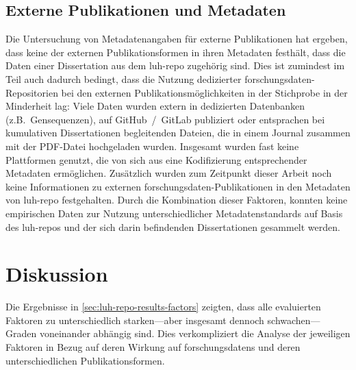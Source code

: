 \subsection{Externe Publikationen und Metadaten}\label{sec:luh-repo-results-external-metadata}
Die Untersuchung von Metadatenangaben für externe Publikationen hat ergeben, dass keine der externen Publikationsformen in ihren Metadaten festhält, dass die Daten einer Dissertation aus dem \gls{luh-repo} zugehörig sind.
Dies ist zumindest im Teil auch dadurch bedingt, dass die Nutzung dedizierter \gls{forschungsdaten}-Repositorien bei den externen Publikationsmöglichkeiten in der Stichprobe in der Minderheit lag:
Viele Daten wurden extern in dedizierten Datenbanken (z.B.~Gensequenzen), auf GitHub~/~GitLab publiziert oder entsprachen bei kumulativen Dissertationen begleitenden Dateien, die in einem Journal zusammen mit der PDF-Datei hochgeladen wurden.
Insgesamt wurden fast keine Plattformen genutzt, die von sich aus eine Kodifizierung entsprechender Metadaten ermöglichen.
Zusätzlich wurden zum Zeitpunkt dieser Arbeit noch keine Informationen zu externen \gls{forschungsdaten}-Publikationen in den Metadaten von \gls{luh-repo} festgehalten.
Durch die Kombination dieser Faktoren, konnten keine empirischen Daten zur Nutzung unterschiedlicher Metadatenstandards auf Basis des \gls{luh-repo}s und der sich darin befindenden Dissertationen gesammelt werden.

\section{Diskussion}\label{sec:luh-repo-discussion}
Die Ergebnisse in \cref{sec:luh-repo-results-factors} zeigten, dass alle evaluierten Faktoren zu unterschiedlich starken---aber insgesamt dennoch schwachen---Graden voneinander abhängig sind.
Dies verkompliziert die Analyse der jeweiligen Faktoren in Bezug auf deren Wirkung auf \glspl{forschungsdaten} und deren unterschiedlichen Publikationsformen.

